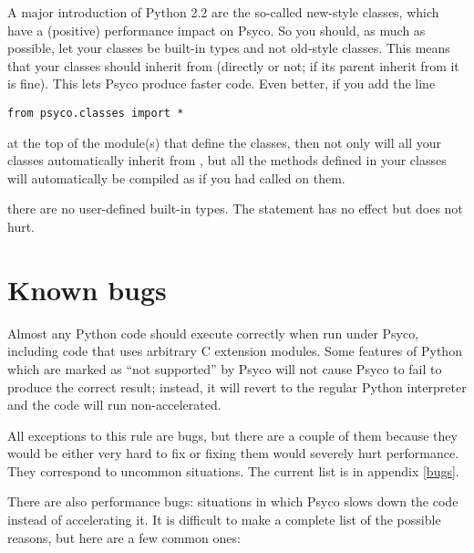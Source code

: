 \documentclass{manual}
\begin{document}
A major introduction of Python 2.2 are the so-called new-style classes, which have a (positive) performance impact on Psyco.  So  you should, as much as possible, let your classes be built-in types and not old-style classes.  This means that your classes should inherit from  (directly or not; if its parent inherit from  it is fine).  This lets Psyco produce faster code.  Even better, if you add the line

\begin{verbatim}
from psyco.classes import *
\end{verbatim}

at the top of the module(s) that define the classes, then not only will all your classes automatically inherit from , but all the methods defined in your classes will automatically be compiled as if you had called  on them.


 there are no user-defined built-in types.  The statement  has no effect but does not hurt.


\section{Known bugs}\label{tutknownbugs}

Almost any Python code should execute correctly when run under Psyco, including code that uses arbitrary C extension modules.  Some features of Python which are marked as ``not supported'' by Psyco will not cause Psyco to fail to produce the correct result; instead, it will revert to the regular Python interpreter and the code will run non-accelerated.

All exceptions to this rule are bugs, but there are a couple of them because they would be either very hard to fix or fixing them would severely hurt performance.  They correspond to uncommon situations.  The current list is in appendix \ref{bugs}.

There are also performance bugs: situations in which Psyco slows down the code instead of accelerating it.  It is difficult to make a complete list of the possible reasons, but here are a few common ones:
\end{document}
